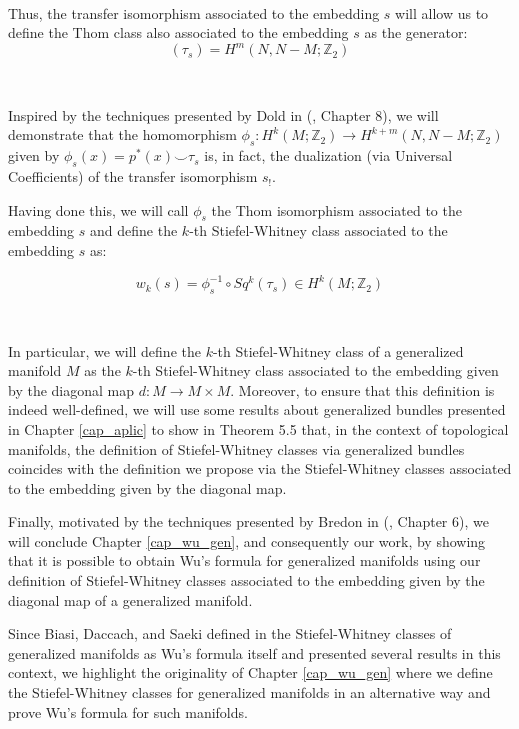 \documentclass[12pt,oneside]{book}
\newcommand{\Z}{\mathbb{Z}}
\newcommand{\ccup}{\smile}
\begin{document}
    \

    Thus, the transfer isomorphism associated to the embedding $s$ will allow us to define the Thom class 
    also associated to the embedding $s$ as the generator: 
    $$(\tau_{s})=H^{m}(N,N-M;\Z_{2})$$

    \

    Inspired by the techniques presented by Dold in (\cite{dold}, Chapter 8), we will demonstrate that the homomorphism 
    $\phi_{s}:H^{k}(M;\Z_{2})\to H^{k+m}(N,N-M;\Z_{2})$ given by $\phi_{s}(x)=p^{*}(x)\ccup \tau_{s}$ is, in fact, the dualization 
    (via Universal Coefficients) of the transfer isomorphism $s_{!}$.

    Having done this, we will call $\phi_{s}$ the Thom isomorphism associated to the embedding $s$ and 
    define the $k$-th Stiefel-Whitney class associated to the embedding $s$ as:

    $$ w_{k}(s)=\phi_{s}^{-1}\circ Sq^{k}(\tau_{s})\in H^{k}(M;\Z_{2}) $$

    \

    In particular, we will define the $k$-th Stiefel-Whitney class of a generalized manifold $M$ as 
    the $k$-th Stiefel-Whitney class associated to the embedding given by the diagonal map 
    $d:M\to M\times M$. Moreover, to ensure that this definition is indeed well-defined, we will use 
    some results about generalized bundles presented in Chapter \ref{cap_aplic} to show in Theorem 5.5 
    that, in the context of topological manifolds, the definition of Stiefel-Whitney classes via 
    generalized bundles coincides with the definition we propose via the Stiefel-Whitney classes 
    associated to the embedding given by the diagonal map.

    Finally, motivated by the techniques presented by Bredon in (\cite{bredon}, Chapter 6), we will 
    conclude Chapter \ref{cap_wu_gen}, and consequently our work, by showing that it is possible to 
    obtain Wu's formula for generalized manifolds using our definition of Stiefel-Whitney classes 
    associated to the embedding given by the diagonal map of a generalized manifold.

    Since Biasi, Daccach, and Saeki defined in \cite{biasi} the Stiefel-Whitney classes of generalized 
    manifolds as Wu's formula itself and presented several results in this context, we highlight the 
    originality of Chapter \ref{cap_wu_gen} where we define the Stiefel-Whitney classes for generalized 
    manifolds in an alternative way and prove Wu's formula for such manifolds.
\end{document}
